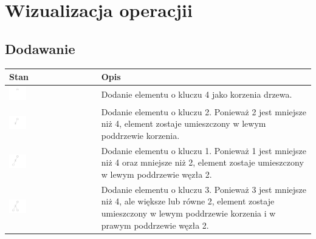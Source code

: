 \documentclass{article}
\begin{document}
\section*{Wizualizacja operacjii}

\subsection*{Dodawanie}


\begin{tabular}{|>{\centering\arraybackslash}m{}|>{\centering\arraybackslash}m{}|}
    \hline
    \textbf{Stan} & \textbf{Opis} \\
    \hline
    \href{https://i.imgur.com/tZArpvb.png}{\includegraphics[width=0.2\textwidth]{"../assets/3_1.png"}} & Dodanie elementu o kluczu 4 jako korzenia drzewa.   \\
    \hline
    \href{https://i.imgur.com/tZArpvb.png}{\includegraphics[width=0.2\textwidth]{"../assets/3_2.png"}} & Dodanie elementu o kluczu 2. Ponieważ 2 jest mniejsze niż 4, element zostaje umieszczony w lewym poddrzewie korzenia.    \\
    \hline
    \href{https://i.imgur.com/48XNmMa.png}{\includegraphics[width=0.2\textwidth]{"../assets/3_3.png"}} & Dodanie elementu o kluczu 1. Ponieważ 1 jest mniejsze niż 4 oraz mniejsze niż 2, element zostaje umieszczony w lewym poddrzewie węzła 2. \\
    \hline
    \href{https://i.imgur.com/c4sM6BP.png}{\includegraphics[width=0.2\textwidth]{"../assets/3_4.png"}} & Dodanie elementu o kluczu 3. Ponieważ 3 jest mniejsze niż 4, ale większe lub równe 2, element zostaje umieszczony w lewym poddrzewie korzenia i w prawym poddrzewie węzła 2. \\

\end{tabular}
\end{document}
